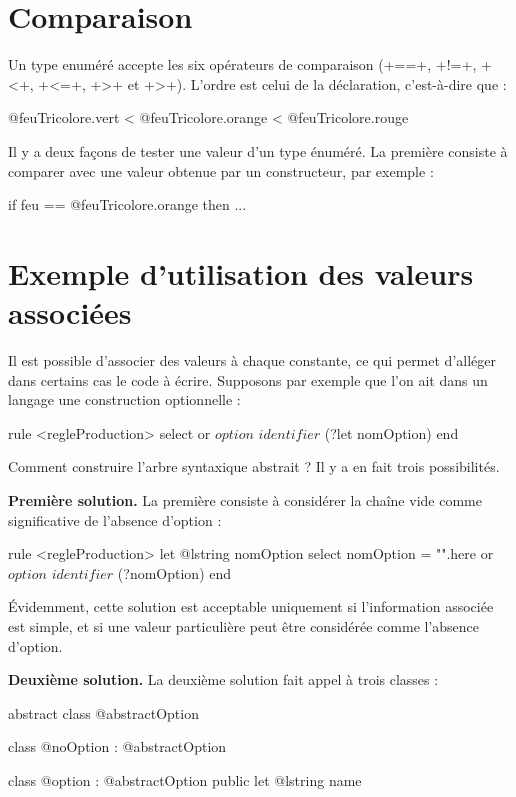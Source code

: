 \section{Comparaison}

Un type enuméré accepte les six opérateurs de comparaison (\ggst+==+, \ggst+!=+, \ggst+<+, \ggst+<=+, \ggst+>+ et \ggst+>+). L'ordre est celui de la déclaration, c'est-à-dire que :
\begin{galgas3}
  @feuTricolore.vert < @feuTricolore.orange < @feuTricolore.rouge
\end{galgas3}

Il y a deux façons de tester une valeur d'un type énuméré. La première consiste à comparer avec une valeur obtenue par un constructeur, par exemple :
\begin{galgas3}
  if feu == @feuTricolore.orange then ...
\end{galgas3}







\section{Exemple d'utilisation des valeurs associées}

Il est possible d'associer des valeurs à chaque constante, ce qui permet d'alléger dans certains cas le code à écrire. Supposons par exemple que l'on ait dans un langage une construction optionnelle :

\begin{galgas34}
rule <regleProduction> {
  select
  or
    $option$
    $identifier$ (?let nomOption)
  end
}
\end{galgas34}

Comment construire l'arbre syntaxique abstrait ? Il y a en fait trois possibilités.

\textbf{Première solution.} La première consiste à considérer la chaîne vide comme significative de l'absence d'option :
\begin{galgas34}
rule <regleProduction> {
  let @lstring nomOption
  select
    nomOption = "".here
  or
    $option$
    $identifier$ (?nomOption)
  end
}
\end{galgas34}

Évidemment, cette solution est acceptable uniquement si l'information associée est simple, et si une valeur particulière peut être considérée comme l'absence d'option.

\textbf{Deuxième solution.} La deuxième solution fait appel à trois classes :
\begin{galgas4}
abstract class @abstractOption {}

class @noOption : @abstractOption {}

class @option : @abstractOption { public let @lstring name }
\end{galgas4}

